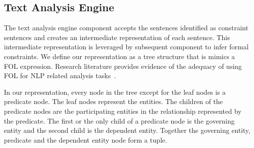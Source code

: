  
%


\subsection{Text Analysis Engine}
\label{sub:TAE}




The text analysis engine component accepts the sentences identified as constraint sentences and creates an intermediate representation of each sentence.
This intermediate representation is leveraged by subsequent component to infer formal constraints.
We define our representation as a tree structure that is mimics a FOL expression.
Research literature provides evidence of the adequacy of using FOL for NLP related analysis tasks~\cite{Sinha2009,Sinha2010,pandita12:inferring, pandita13:WHYPER}.

In our representation, every node in the tree except for the leaf nodes is a predicate node. 
The leaf nodes represent the entities.
The children of the predicate nodes are the participating entities in the relationship represented by the predicate.
The first or the only child of a predicate node is the governing entity and the second child is the dependent entity.
Together the governing entity, predicate and the dependent entity node form a tuple. 


